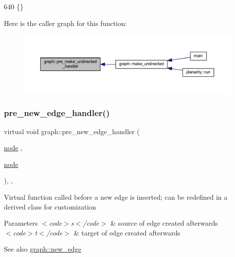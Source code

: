 \begin{DoxyCode}
640 \{\}
\end{DoxyCode}
Here is the caller graph for this function\+:
\nopagebreak
\begin{figure}[H]
\begin{center}
\leavevmode
\includegraphics[width=350pt]{classgraph_a8964107991e6f411ba8992f6b1deda21_icgraph}
\end{center}
\end{figure}
\mbox{\label{classgraph_a0a7a68fa0baa47ef955525c445fa1a04}} 
\subsubsection{\texorpdfstring{pre\+\_\+new\+\_\+edge\+\_\+handler()}{pre\_new\_edge\_handler()}}
{\footnotesize\ttfamily virtual void graph\+::pre\+\_\+new\+\_\+edge\+\_\+handler (\begin{DoxyParamCaption}\item[{\mbox{\hyperlink{classnode}{node}}}]{,  }\item[{\mbox{\hyperlink{classnode}{node}}}]{ }\end{DoxyParamCaption})\hspace{0.3cm}{\ttfamily [inline]}, {\ttfamily [virtual]}, {\ttfamily [inherited]}}

Virtual function called before a new edge is inserted; can be redefined in a derived class for customization


\begin{DoxyParams}{Parameters}
{\em $<$code$>$s$<$/code$>$} & source of edge created afterwards \\
\hline
{\em $<$code$>$t$<$/code$>$} & target of edge created afterwards \\
\hline
\end{DoxyParams}
\begin{DoxySeeAlso}{See also}
\mbox{\hyperlink{classgraph_a02a0c3a219f75d68caa408ef339d4a1c}{graph\+::new\+\_\+edge}} 
\end{DoxySeeAlso}



